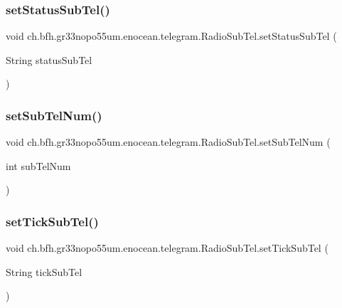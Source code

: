 \subsubsection{\texorpdfstring{set\+Status\+Sub\+Tel()}{setStatusSubTel()}}
{\footnotesize\ttfamily void ch.\+bfh.\+gr33nopo55um.\+enocean.\+telegram.\+Radio\+Sub\+Tel.\+set\+Status\+Sub\+Tel (\begin{DoxyParamCaption}\item[{String}]{status\+Sub\+Tel }\end{DoxyParamCaption})}

\hypertarget{classch_1_1bfh_1_1gr33nopo55um_1_1enocean_1_1telegram_1_1_radio_sub_tel_a7e1b82f545add4ef23b330d63c58e174}{}\label{classch_1_1bfh_1_1gr33nopo55um_1_1enocean_1_1telegram_1_1_radio_sub_tel_a7e1b82f545add4ef23b330d63c58e174} 
\subsubsection{\texorpdfstring{set\+Sub\+Tel\+Num()}{setSubTelNum()}}
{\footnotesize\ttfamily void ch.\+bfh.\+gr33nopo55um.\+enocean.\+telegram.\+Radio\+Sub\+Tel.\+set\+Sub\+Tel\+Num (\begin{DoxyParamCaption}\item[{int}]{sub\+Tel\+Num }\end{DoxyParamCaption})}

\hypertarget{classch_1_1bfh_1_1gr33nopo55um_1_1enocean_1_1telegram_1_1_radio_sub_tel_a8e91c89f2d191d545ac526a3f5998909}{}\label{classch_1_1bfh_1_1gr33nopo55um_1_1enocean_1_1telegram_1_1_radio_sub_tel_a8e91c89f2d191d545ac526a3f5998909} 
\subsubsection{\texorpdfstring{set\+Tick\+Sub\+Tel()}{setTickSubTel()}}
{\footnotesize\ttfamily void ch.\+bfh.\+gr33nopo55um.\+enocean.\+telegram.\+Radio\+Sub\+Tel.\+set\+Tick\+Sub\+Tel (\begin{DoxyParamCaption}\item[{String}]{tick\+Sub\+Tel }\end{DoxyParamCaption})}

